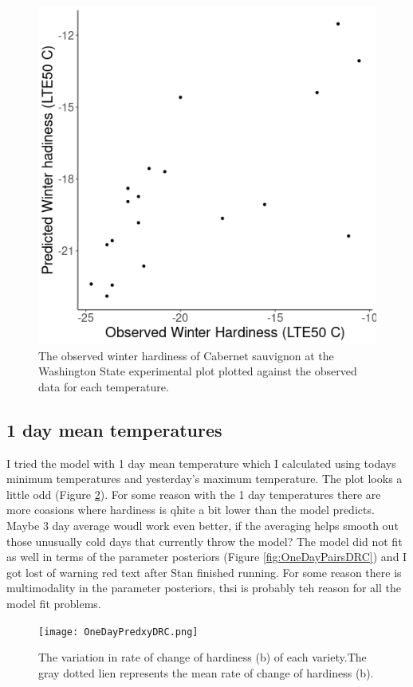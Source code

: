 \documentclass[11pt,letter]{article}
\begin{document}
\begin{figure}
  \includegraphics[scale = 0.75]{WashingtonPrediction2.png}
  \caption{The observed winter hardiness of Cabernet sauvignon at the Washington State experimental plot plotted against the observed data for each temperature. }
  \label{fig:WashingtonPredictionyy}
\end{figure}

\subsection{1 day mean temperatures}
I tried the model with 1 day mean temperature which I calculated using todays minimum temperatures and yesterday's maximum temperature. The plot looks a little odd (Figure \ref{fig:OneDayPredxyDRC}). For some reason with the 1 day temperatures there are more coasions where hardiness is qhite a bit lower than the model predicts. Maybe 3 day average woudl work even better, if the averaging helps smooth out those unusually cold days that currently throw the model? The model did not fit as well in terms of the parameter posteriors (Figure \ref{fig:OneDayPairsDRC}) and I got lost of warning red text after Stan finished running. For some reason there is multimodality in the parameter posteriors, thsi is probably teh reason for all the model fit problems.  

\begin{figure}
  \texttt{[image: OneDayPredxyDRC.png]}
  \caption{The variation in rate of change of hardiness (b) of each variety.The gray dotted lien represents the mean rate of change of hardiness (b).}
  \label{fig:OneDayPredxyDRC}
\end{figure}
\end{document}
